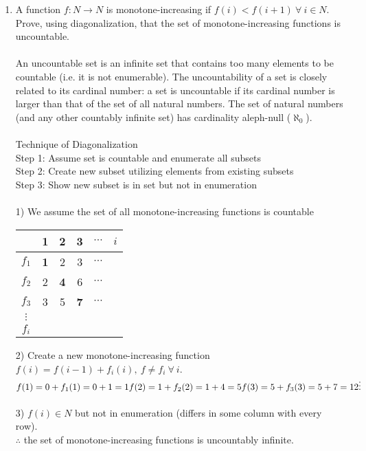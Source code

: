 \documentclass[10pt,a4paper,final]{article}
\begin{document}
\begin{enumerate}
\item %
A function $f : N \rightarrow N$ is monotone-increasing if $f(i) < f(i+1) \: \forall \: i \in N$.\\
Prove, using diagonalization, that the set of monotone-increasing functions is
uncountable.\\
\\
An uncountable set is an infinite set that contains too many elements to be countable
(i.e. it is not enumerable).
The uncountability of a set is closely related to its cardinal number:
a set is uncountable if its cardinal number is larger than that of the set of all natural numbers.
The set of natural numbers (and any other countably infinite set) has cardinality aleph-null
($\aleph_0$).\\
\\
Technique of Diagonalization\\
Step 1: Assume set is countable and enumerate all subsets\\
Step 2: Create new subset utilizing elements from existing subsets\\
Step 3: Show new subset is in set but not in enumeration\\
\\
1) We assume the set of all monotone-increasing functions is countable
\begin{tabular}{c|c c c c c}
& 1 & 2 & 3 & $\cdots$ & $i$ \\
\hline
$f_1$ & \textbf{1} & 2 & 3 & $\cdots$\\
$f_2$ & 2 & \textbf{4} & 6 & $\cdots$\\
$f_3$ & 3 & 5 & \textbf{7} & $\cdots$\\
$\vdots$\\
$f_i$\\
\end{tabular}
2) Create a new monotone-increasing function $f(i) = f(i-1) + f_i(i),\: f \neq f_i \: \forall \: i$.\\
$f(1) = 0 + f_1(1) = 0 + 1 = 1\\
f(2) = 1 + f_2(2) = 1 + 4 = 5\\
f(3) = 5 + f_3(3) = 5 + 7 = 12\\
\vdots$\\
\\
3) $f(i) \in N$ but not in enumeration (differs in some column with every row).\\
$\therefore$ the set of monotone-increasing functions is uncountably infinite.


\end{enumerate}
\end{document}
